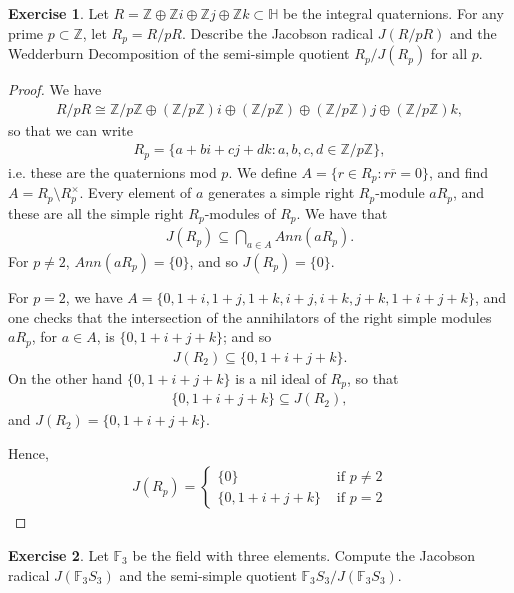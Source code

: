 \documentclass[12pt]{extarticle}
\newcommand{\set}[1]{\{#1\}}
\newcommand{\Z}{\mathbb{Z}}
\newcommand{\<}{\langle}
\renewcommand{\>}{\rangle}
\theoremstyle{definition}
\newtheorem{exercise}{Exercise}
\begin{document}
\begin{exercise}
  Let $R = \Z \oplus \Z i \oplus \Z j \oplus \Z k \subset \mathbb{H}$ be the integral quaternions. For any prime $p \subset \Z$, let $R_p = R / pR$.
  Describe the Jacobson radical $J(R/pR)$ and the Wedderburn Decomposition of the semi-simple quotient $R_p/J(R_p)$ for all $p$. 
\end{exercise}
\begin{proof}
  We have
  \begin{align*}
    R/pR \cong \Z/p\Z \oplus (\Z/p\Z)i \oplus (\Z/p\Z) \oplus (\Z/p\Z)j \oplus (\Z/p\Z) k, 
  \end{align*}
  so that we can write
  \begin{align*}
    R_p = \set{a+bi+cj+dk : a,b,c,d \in \Z/p\Z},
  \end{align*}
  i.e. these are the quaternions mod $p$. We define $A= \set{r \in R_p: r \overline{r} = 0}$, and find $A = R_p \setminus R_p^\times$.
  Every element of $a$ generates a simple right $R_p$-module $aR_p$, and these are all the simple right $R_p$-modules of $R_p$. We have that
  \begin{align*}
   J(R_p) \subseteq \bigcap \limits_{a \in A} Ann(aR_p).
  \end{align*}
  For $p \neq 2$, $Ann(aR_p) = \set{0}$, and so $J(R_p) = \set{0}$.

  For $p = 2$, we have $A = \set{0, 1+i, 1+j, 1+k, i+j, i+k, j+k, 1+i+j+k}$, and one checks that the intersection of the annihilators of the right simple modules $aR_p$, for $a \in A$, is
  $\set{ 0, 1+i+j+k}$; and so
  \begin{align*}
    J(R_2) \subseteq \set{0, 1+i+j+k}.
  \end{align*}
  On the other hand $\set{0, 1+i+j+k}$ is a nil ideal of $R_p$, so that
  \begin{align*}
    \set{0,1+i+j+k} \subseteq J(R_2),
  \end{align*}
  and $J(R_2) = \set{0,1+i+j+k}$.

  Hence,
  \begin{align*}
    J(R_p)=
    \begin{cases}
      \set{0} & \text{ if } p \neq 2 \\
      \set{0,1+i+j+k}  & \text{ if } p = 2
    \end{cases}
  \end{align*}
\end{proof}
\begin{exercise}
  Let $\mathbb{F}_3$ be the field with three elements. Compute the Jacobson radical $J(\mathbb{F}_3S_3)$ and the semi-simple quotient $\mathbb{F}_3 S_3 / J(\mathbb{F}_3 S_3)$. 
\end{exercise}
\end{document}
